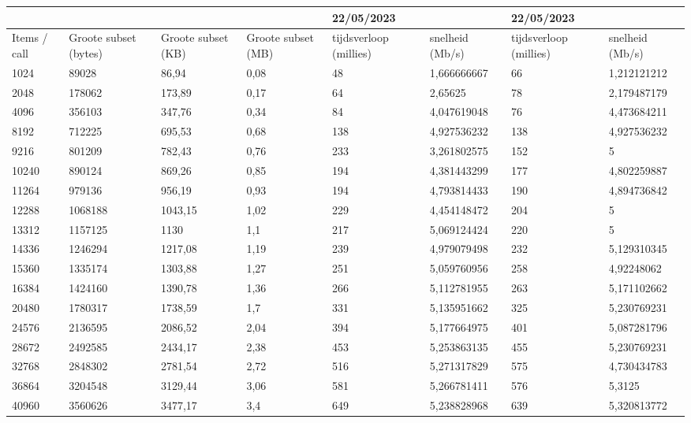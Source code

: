 \begin{table}
    \centering
    \begin{tabular}{llllllll}
        \toprule
        \textbf{} & \textbf{} & \textbf{} & \textbf{} & \textbf{22/05/2023} & \textbf{} & \textbf{22/05/2023} & \textbf{} \\
        \midrule
        Items / call & Groote subset (bytes) & Groote subset (KB) & Groote subset (MB) & tijdsverloop (millies) & snelheid (Mb/s) & tijdsverloop (millies) & snelheid (Mb/s) \\
        1024 & 89028 & 86,94 & 0,08 & 48 & 1,666666667 & 66 & 1,212121212 \\
        2048 & 178062 & 173,89 & 0,17 & 64 & 2,65625 & 78 & 2,179487179 \\
        4096 & 356103 & 347,76 & 0,34 & 84 & 4,047619048 & 76 & 4,473684211 \\
        8192 & 712225 & 695,53 & 0,68 & 138 & 4,927536232 & 138 & 4,927536232 \\
        9216 & 801209 & 782,43 & 0,76 & 233 & 3,261802575 & 152 & 5 \\
        10240 & 890124 & 869,26 & 0,85 & 194 & 4,381443299 & 177 & 4,802259887 \\
        11264 & 979136 & 956,19 & 0,93 & 194 & 4,793814433 & 190 & 4,894736842 \\
        12288 & 1068188 & 1043,15 & 1,02 & 229 & 4,454148472 & 204 & 5 \\
        13312 & 1157125 & 1130 & 1,1 & 217 & 5,069124424 & 220 & 5 \\
        14336 & 1246294 & 1217,08 & 1,19 & 239 & 4,979079498 & 232 & 5,129310345 \\
        15360 & 1335174 & 1303,88 & 1,27 & 251 & 5,059760956 & 258 & 4,92248062 \\
        16384 & 1424160 & 1390,78 & 1,36 & 266 & 5,112781955 & 263 & 5,171102662 \\
        20480 & 1780317 & 1738,59 & 1,7 & 331 & 5,135951662 & 325 & 5,230769231 \\
        24576 & 2136595 & 2086,52 & 2,04 & 394 & 5,177664975 & 401 & 5,087281796 \\
        28672 & 2492585 & 2434,17 & 2,38 & 453 & 5,253863135 & 455 & 5,230769231 \\
        32768 & 2848302 & 2781,54 & 2,72 & 516 & 5,271317829 & 575 & 4,730434783 \\
        36864 & 3204548 & 3129,44 & 3,06 & 581 & 5,266781411 & 576 & 5,3125 \\
        40960 & 3560626 & 3477,17 & 3,4 & 649 & 5,238828968 & 639 & 5,320813772 \\

\end{tabular}
\end{table}
